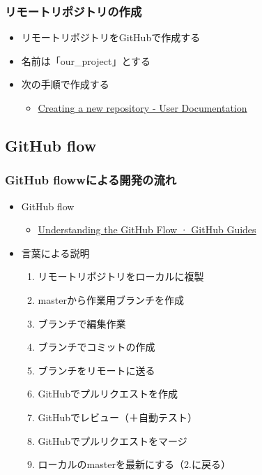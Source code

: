\documentclass[a4paper,twoside,twocolumn]{bxjsarticle}
\begin{document}
\subsubsection{リモートリポジトリの作成}
\label{sec-2-2-2}
\begin{itemize}
\item リモートリポジトリをGitHubで作成する
\item 名前は「our\_project」とする
\item 次の手順で作成する
\begin{itemize}
\item \href{https://help.github.com/articles/creating-a-new-repository/}{Creating a new repository - User Documentation}
\end{itemize}
\end{itemize}

\subsection{GitHub flow}
\label{sec-2-3}
\subsubsection{GitHub flowwによる開発の流れ}
\label{sec-2-3-1}
\begin{itemize}
\item GitHub flow
\begin{itemize}
\item \href{https://guides.github.com/introduction/flow/}{Understanding the GitHub Flow · GitHub Guides}
\end{itemize}
\item 言葉による説明
\begin{enumerate}
\item リモートリポジトリをローカルに複製
\item masterから作業用ブランチを作成
\item ブランチで編集作業
\item ブランチでコミットの作成
\item ブランチをリモートに送る
\item GitHubでプルリクエストを作成
\item GitHubでレビュー（＋自動テスト）
\item GitHubでプルリクエストをマージ
\item ローカルのmasterを最新にする（2.に戻る）
\end{enumerate}
\end{itemize}
\end{document}
